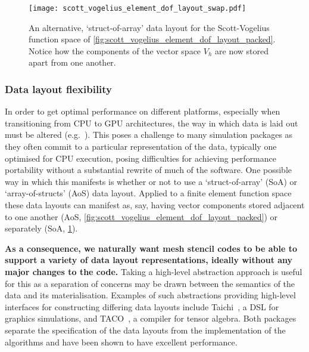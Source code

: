 \documentclass[thesis]{subfiles}
\begin{document}
\begin{figure}
  \centering
  \texttt{[image: scott\_vogelius\_element\_dof\_layout\_swap.pdf]}
  \caption{
    An alternative, `struct-of-array' data layout for the Scott-Vogelius function space of \cref{fig:scott_vogelius_element_dof_layout_packed}.
    Notice how the components of the vector space $V_h$ are now stored apart from one another.
  }
  \label{fig:scott_vogelius_element_dof_layout_swap}
\end{figure}

\subsubsection{Data layout flexibility}
\label{sec:intro_data_layout_flex}

In order to get optimal performance on different platforms, especially when transitioning from CPU to GPU architectures, the way in which data is laid out must be altered (e.g.~\cite{markallFiniteElementAssembly2013,sulyokImprovingLocalityUnstructured2018}).
This poses a challenge to many simulation packages as they often commit to a particular representation of the data, typically one optimised for CPU execution, posing difficulties for achieving performance portability without a substantial rewrite of much of the software.
One possible way in which this manifests is whether or not to use a `struct-of-array' (SoA) or `array-of-structs' (AoS) data layout.
Applied to a finite element function space these data layouts can manifest as, say, having vector components stored adjacent to one another (AoS, \cref{fig:scott_vogelius_element_dof_layout_packed}) or separately (SoA, \cref{fig:scott_vogelius_element_dof_layout_swap}).

\textbf{As a consequence, we naturally want mesh stencil codes to be able to support a variety of data layout representations, ideally without any major changes to the code.}
Taking a high-level abstraction approach is useful for this as a separation of concerns may be drawn between the semantics of the data and its materialisation.
Examples of such abstractions providing high-level interfaces for constructing differing data layouts include Taichi~\cite{huTaichiLanguageHighperformance2019}, a DSL for graphics simulations, and TACO~\cite{kjolstadTacoToolGenerate2017}, a compiler for tensor algebra.
Both packages separate the specification of the data layouts from the implementation of the algorithms and have been shown to have excellent performance.
\end{document}
